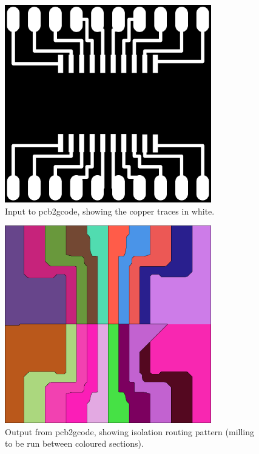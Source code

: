 \documentclass[a4paper,11pt]{article}  %
\begin{document}
\begin{figure}[ht!]
\centering
\includegraphics[width=90mm]{resources/breakout_copper.png}
\caption{Input to pcb2gcode, showing the copper traces in white.}
\label{overflow}
\end{figure}

\begin{figure}[ht!]
\centering
\includegraphics[width=90mm]{resources/breakout_isolation.png}
\caption{Output from pcb2gcode, showing isolation routing pattern (milling to be run between coloured sections).}
\label{overflow}
\end{figure}
\end{document}
